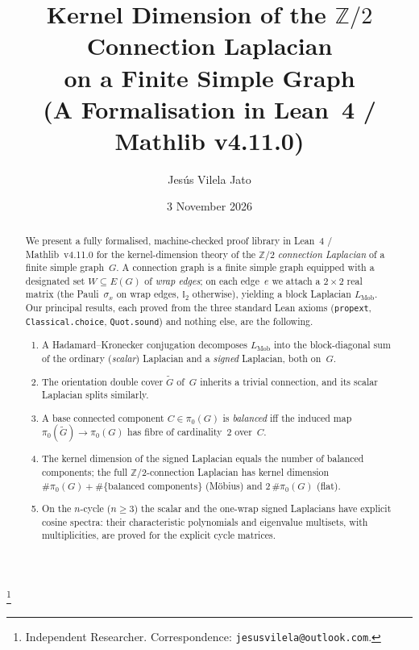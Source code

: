 \documentclass[11pt,a4paper]{amsart}
\theoremstyle{plain}
\theoremstyle{definition}
\theoremstyle{remark}
\newcommand{\ZZ}{\mathbb{Z}}
\newcommand{\II}{\mathbb{I}}
\newcommand{\tG}{\widetilde{G}}
\newcommand{\comp}{\pi_0}
\begin{document}
\title[Kernel Dimension of the $\ZZ/2$ Connection Laplacian]{%
Kernel Dimension of the $\ZZ/2$ Connection Laplacian \\
on a Finite Simple Graph \\
{\small (A Formalisation in Lean~4 / Mathlib v4.11.0)}}

\author{Jes\'us Vilela Jato}
\thanks{Independent Researcher. Correspondence: \texttt{jesusvilela@outlook.com}.}
\date{3 November 2026}


\begin{abstract}
We present a fully formalised, machine-checked proof library in
Lean~4 / Mathlib~v4.11.0 for the kernel-dimension theory of the
$\ZZ/2$ \emph{connection Laplacian} of a finite simple graph~$G$.
A connection graph is a finite simple graph equipped with a
designated set $W\subseteq E(G)$ of \emph{wrap edges}; on each
edge~$e$ we attach a $2\times 2$ real matrix (the Pauli~$\sigma_x$
on wrap edges, $\II_2$ otherwise), yielding a block Laplacian
$L_{\operatorname{Mob}}$.
Our principal results, each proved from the three standard Lean
axioms (\texttt{propext}, \texttt{Classical.choice},
\texttt{Quot.sound}) and nothing else, are the following.

\begin{enumerate}[label=\textbf{(\roman*)}]
  \item A Hadamard--Kronecker conjugation decomposes
    $L_{\operatorname{Mob}}$ into the block-diagonal sum of the
    ordinary (\emph{scalar}) Laplacian and a \emph{signed} Laplacian,
    both on~$G$.
  \item The orientation double cover $\tG$ of~$G$ inherits a trivial
    connection, and its scalar Laplacian splits similarly.
  \item A base connected component $C\in \comp(G)$ is
    \emph{balanced} iff the induced map $\comp(\tG)\to \comp(G)$ has
    fibre of cardinality~$2$ over~$C$.
  \item The kernel dimension of the signed Laplacian equals the number
    of balanced components; the full $\ZZ/2$-connection Laplacian has
    kernel dimension $\# \comp(G) + \#\{\text{balanced components}\}$
    (Möbius) and $2\,\#\comp(G)$ (flat).
  \item On the $n$-cycle ($n\ge 3$) the scalar and the one-wrap signed
    Laplacians have explicit cosine spectra: their characteristic
    polynomials and eigenvalue multisets, with multiplicities, are
    proved for the explicit cycle matrices.
\end{enumerate}


\end{abstract}
\end{document}
